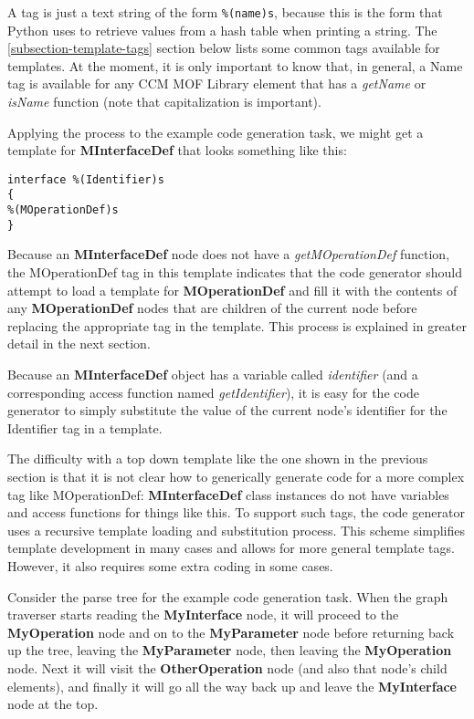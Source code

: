 A tag is just a text string of the form {\tt \%(name)s}, because this is the
form that Python uses to retrieve values from a hash table when printing a
string. The \ref{subsection-template-tags} section below lists some common tags
available for templates. At the moment, it is only important to know that, in
general, a {\sf Name} tag is available for any CCM MOF Library element that has
a {\it getName\/} or {\it isName\/} function (note that capitalization is
important).

Applying the process to the example code generation task, we might get a
template for {\bf MInterfaceDef} that looks something like this:

\begin{verbatim}
interface %(Identifier)s
{
%(MOperationDef)s
}
\end{verbatim}

Because an {\bf MInterfaceDef} node does not have a {\it getMOperationDef\/}
function, the {\sf MOperationDef} tag in this template indicates that the code
generator should attempt to load a template for {\bf MOperationDef} and fill it
with the contents of any {\bf MOperationDef} nodes that are children of the
current node before replacing the appropriate tag in the template. This process
is explained in greater detail in the next section.




Because an {\bf MInterfaceDef} object has a variable called {\it identifier\/}
(and a corresponding access function named {\it getIdentifier\/}), it is easy
for the code generator to simply substitute the value of the current node's
identifier for the {\sf Identifier} tag in a template.

The difficulty with a top down template like the one shown in the previous
section is that it is not clear how to generically generate code for a more
complex tag like {\sf MOperationDef}: {\bf MInterfaceDef} class instances do not
have variables and access functions for things like this. To support such tags,
the code generator uses a recursive template loading and substitution process.
This scheme simplifies template development in many cases and allows for more
general template tags. However, it also requires some extra coding in some
cases.

Consider the parse tree for the example code generation task. When the graph
traverser starts reading the {\bf MyInterface} node, it will proceed to the {\bf
MyOperation} node and on to the {\bf MyParameter} node before returning back up
the tree, leaving the {\bf MyParameter} node, then leaving the {\bf MyOperation}
node. Next it will visit the {\bf OtherOperation} node (and also that node's
child elements), and finally it will go all the way back up and leave the {\bf
MyInterface} node at the top.

